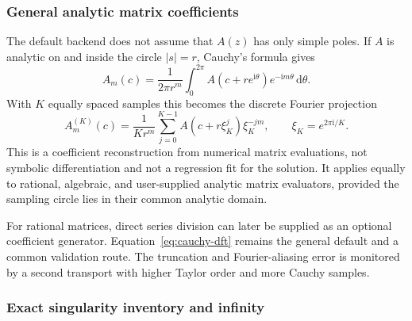 \documentclass[11pt]{article}
\newcommand{\dd}{\mathrm d}
\begin{document}
\subsubsection{General analytic matrix coefficients}

The default backend does not assume that $A(z)$ has only simple poles.  If $A$ is analytic
on and inside the circle $|s|=r$, Cauchy's formula gives
\begin{equation}
  A_m(c)=\frac{1}{2\pi r^m}\int_0^{2\pi}
  A(c+r e^{\mathrm i\theta})e^{-\mathrm i m\theta}\,\dd\theta.
\end{equation}
With $K$ equally spaced samples this becomes the discrete Fourier projection
\begin{equation}
  A_m^{(K)}(c)=\frac{1}{K r^m}\sum_{j=0}^{K-1}
  A(c+r\xi_K^j)\xi_K^{-jm},
  \qquad \xi_K=e^{2\pi\mathrm i/K}.
  \label{eq:cauchy-dft}
\end{equation}
This is a coefficient reconstruction from numerical matrix evaluations, not symbolic
differentiation and not a regression fit for the solution.  It applies equally to rational,
algebraic, and user-supplied analytic
matrix evaluators, provided the sampling circle lies in their common analytic domain.

For rational matrices, direct series division can later be supplied as an optional
coefficient generator.  Equation~\eqref{eq:cauchy-dft} remains the general default and a
common validation route.  The truncation and Fourier-aliasing error is monitored by a second
transport with higher Taylor order and more Cauchy samples.

\subsubsection{Exact singularity inventory and infinity}
\label{subsec:singularity-inventory}
\end{document}
